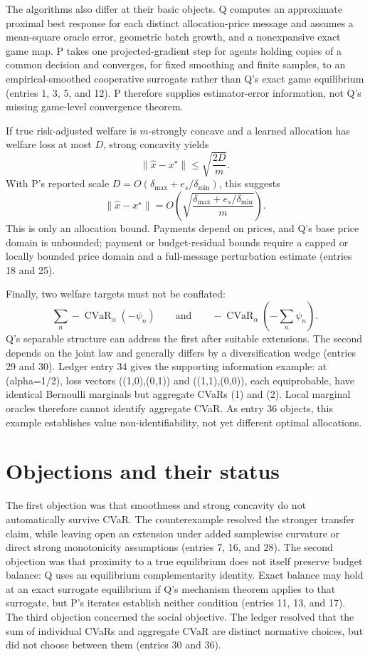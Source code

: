 \documentclass{article}
\begin{document}
The algorithms also differ at their basic objects. Q computes an approximate proximal best response for each distinct allocation-price message and assumes a mean-square oracle error, geometric batch growth, and a nonexpansive exact game map. P takes one projected-gradient step for agents holding copies of a common decision and converges, for fixed smoothing and finite samples, to an empirical-smoothed cooperative surrogate rather than Q's exact game equilibrium (entries 1, 3, 5, and 12). P therefore supplies estimator-error information, not Q's missing game-level convergence theorem.

If true risk-adjusted welfare is \(m\)-strongly concave and a learned allocation has welfare loss at most \(D\), strong concavity yields
\[
\lVert \widehat x-x^\star\rVert
\leq \sqrt{\frac{2D}{m}}.
\]
With P's reported scale \(D=O(\delta_{\max}+e_s/\delta_{\min})\), this suggests
\[
\lVert \widehat x-x^\star\rVert
=O\left(\sqrt{\frac{\delta_{\max}+e_s/\delta_{\min}}{m}}\right).
\]
This is only an allocation bound. Payments depend on prices, and Q's base price domain is unbounded; payment or budget-residual bounds require a capped or locally bounded price domain and a full-message perturbation estimate (entries 18 and 25).

Finally, two welfare targets must not be conflated:
\[
\sum_n-\operatorname{CVaR}_{\alpha}(-\psi_n)
\qquad\text{and}\qquad
-\operatorname{CVaR}_{\alpha}\left(-\sum_n\psi_n\right).
\]
Q's separable structure can address the first after suitable extensions. The second depends on the joint law and generally differs by a diversification wedge (entries 29 and 30). Ledger entry 34 gives the supporting information example: at (alpha=1/2), loss vectors ((1,0),(0,1)) and ((1,1),(0,0)), each equiprobable, have identical Bernoulli marginals but aggregate CVaRs (1) and (2). Local marginal oracles therefore cannot identify aggregate CVaR. As entry 36 objects, this example establishes value non-identifiability, not yet different optimal allocations.

\section*{Objections and their status}
The first objection was that smoothness and strong concavity do not automatically survive CVaR. The counterexample resolved the stronger transfer claim, while leaving open an extension under added samplewise curvature or direct strong monotonicity assumptions (entries 7, 16, and 28). The second objection was that proximity to a true equilibrium does not itself preserve budget balance: Q uses an equilibrium complementarity identity. Exact balance may hold at an exact surrogate equilibrium if Q's mechanism theorem applies to that surrogate, but P's iterates establish neither condition (entries 11, 13, and 17). The third objection concerned the social objective. The ledger resolved that the sum of individual CVaRs and aggregate CVaR are distinct normative choices, but did not choose between them (entries 30 and 36).
\end{document}
